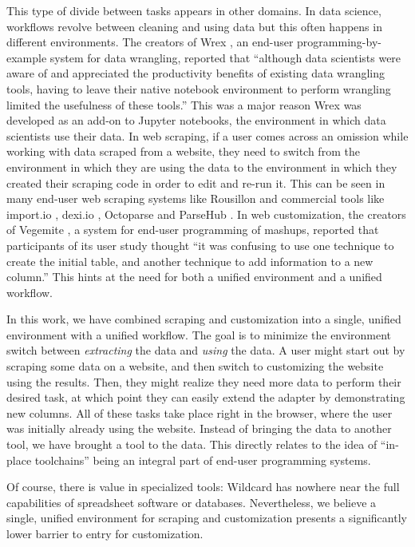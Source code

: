 \documentclass[sigconf,10pt]{acmart}
\begin{document}
This type of divide between tasks appears in other domains. In data
science, workflows revolve between cleaning and using data but this
often happens in different environments. The creators of Wrex
\citep{drosos2020}, an end-user programming-by-example system for data
wrangling, reported that ``although data scientists were aware of and
appreciated the productivity benefits of existing data wrangling tools,
having to leave their native notebook environment to perform wrangling
limited the usefulness of these tools.'' This was a major reason Wrex
was developed as an add-on to Jupyter notebooks, the environment in
which data scientists use their data. In web scraping, if a user comes
across an omission while working with data scraped from a website, they
need to switch from the environment in which they are using the data to
the environment in which they created their scraping code in order to
edit and re-run it. This can be seen in many end-user web scraping
systems like Rousillon \citep{chasins2018} and commercial tools like
import.io \citep{zotero-77}, dexi.io \citep{dexi.io}, Octoparse
\citep{zotero-83} and ParseHub \citep{zotero-86}. In web customization,
the creators of Vegemite \citep{lin2009}, a system for end-user
programming of mashups, reported that participants of its user study
thought ``it was confusing to use one technique to create the initial
table, and another technique to add information to a new column.'' This
hints at the need for both a unified environment and a unified workflow.

In this work, we have combined scraping and customization into a single,
unified environment with a unified workflow. The goal is to minimize the
environment switch between \emph{extracting} the data and \emph{using}
the data. A user might start out by scraping some data on a website, and
then switch to customizing the website using the results. Then, they
might realize they need more data to perform their desired task, at
which point they can easily extend the adapter by demonstrating new
columns. All of these tasks take place right in the browser, where the
user was initially already using the website. Instead of bringing the
data to another tool, we have brought a tool to the data. This directly
relates to the idea of ``in-place toolchains'' \citep{zotero-60} being
an integral part of end-user programming systems.

Of course, there is value in specialized tools: Wildcard has nowhere
near the full capabilities of spreadsheet software or databases.
Nevertheless, we believe a single, unified environment for scraping and
customization presents a significantly lower barrier to entry for
customization.
\end{document}

